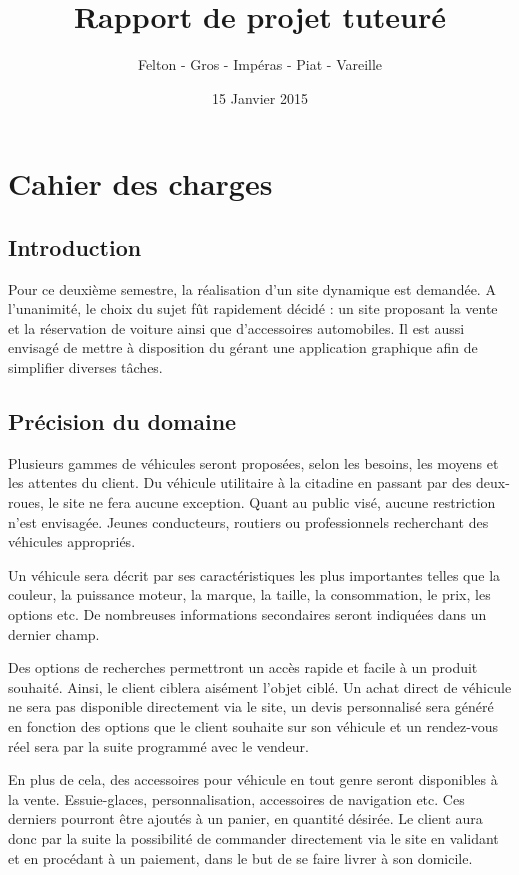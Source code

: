 \documentclass[a4paper]{article}
\title{\Huge \textbf{Rapport de projet tuteuré}}
\author{\Large Felton - Gros - Impéras - Piat - Vareille}
\date{15 Janvier 2015}
\begin{document}
\maketitle
\newpage

\tableofcontents
\newpage

\section{Cahier des charges}
	\subsection*{Introduction}
	
	Pour ce deuxième semestre, la réalisation d'un site dynamique est demandée. A l'unanimité, le choix du sujet fût rapidement décidé : un site proposant la vente et la réservation de voiture ainsi que d'accessoires automobiles. Il est aussi envisagé de mettre à disposition du gérant une application graphique afin de simplifier diverses tâches.
	\subsection{Précision du domaine}
	
	Plusieurs gammes de véhicules seront proposées, selon les besoins, les moyens et les attentes du client. Du véhicule utilitaire à la citadine en passant par des deux-roues, le site ne fera aucune exception. Quant au public visé, aucune restriction n'est envisagée. Jeunes conducteurs, routiers ou professionnels recherchant des véhicules appropriés.
	
	Un véhicule sera décrit par ses caractéristiques les plus importantes telles que la couleur, la puissance moteur, la marque, la taille, la consommation, le prix, les options etc. De nombreuses informations secondaires seront indiquées dans un dernier champ.

	Des options de recherches permettront un accès rapide et facile à un produit souhaité. Ainsi, le client ciblera aisément l'objet ciblé.
Un achat direct de véhicule ne sera pas disponible directement via le site, un devis personnalisé sera généré en fonction des options que le client souhaite sur son véhicule et un rendez-vous réel sera par la suite programmé avec le vendeur.

	En plus de cela, des accessoires pour véhicule en tout genre seront disponibles à la vente. Essuie-glaces, personnalisation, accessoires de navigation etc. Ces derniers pourront être ajoutés à un panier, en quantité désirée. Le client aura donc par la suite la possibilité de commander directement via le site en validant et en procédant à un paiement, dans le but de se faire livrer à son domicile.
	
\end{document}
